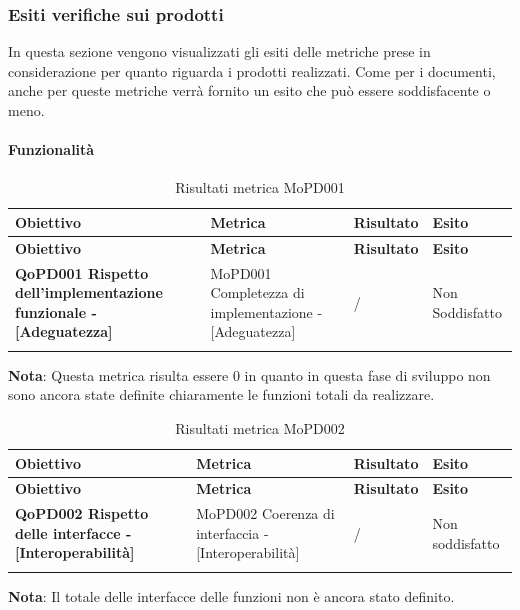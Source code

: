 \documentclass[../piano-di-qualifica.tex]{subfiles}
\begin{document}
\subsubsection{Esiti verifiche sui prodotti}
\label{sub:esiti_verifiche_sui_prodotti}
In questa sezione vengono visualizzati gli esiti delle metriche prese in considerazione per quanto riguarda i prodotti realizzati. Come per i documenti, anche per queste metriche verrà fornito un esito che può essere soddisfacente o meno.

\paragraph{Funzionalità}
\label{sub:funzionalita}

\renewcommand{\arraystretch}{2} %
\begin{longtable}[H]{>{\centering\bfseries}m{5cm} >{\centering}m{5cm} >{\centering}m{2.5cm} >{\centering\arraybackslash}m{2.5cm}}  
  \rowcolor{lightgray}
  {\textbf{Obiettivo}} & {\textbf{Metrica}} & {\textbf{Risultato}} & {\textbf{Esito}}  \\
  \endfirsthead%
  \rowcolor{lightgray}
  {\textbf{Obiettivo}} & {\textbf{Metrica}} & {\textbf{Risultato}} & {\textbf{Esito}}  \\
  \endhead%
  \textbf{QoPD001 Rispetto dell’implementazione funzionale - [Adeguatezza]} & MoPD001 Completezza di implementazione - [Adeguatezza] & / & Non Soddisfatto \\
  \caption{Risultati metrica MoPD001}
  \label{tab:my-table}
\end{longtable}
\textbf{Nota}: Questa metrica risulta essere 0 in quanto in questa fase di sviluppo non sono ancora state definite chiaramente le funzioni totali da realizzare.

\renewcommand{\arraystretch}{2} %
\begin{longtable}[H]{>{\centering\bfseries}m{5cm} >{\centering}m{5cm} >{\centering}m{2.5cm} >{\centering\arraybackslash}m{2.5cm}}  
  \rowcolor{lightgray}
  {\textbf{Obiettivo}} & {\textbf{Metrica}} & {\textbf{Risultato}} & {\textbf{Esito}}  \\
  \endfirsthead%
  \rowcolor{lightgray}
  {\textbf{Obiettivo}} & {\textbf{Metrica}} & {\textbf{Risultato}} & {\textbf{Esito}}  \\
  \endhead%
  \textbf{QoPD002 Rispetto delle interfacce - [Interoperabilità]} & MoPD002 Coerenza di interfaccia - [Interoperabilità] & / & Non soddisfatto \\
  \caption{Risultati metrica MoPD002}
  \label{tab:my-table}
\end{longtable}
\textbf{Nota}: Il totale delle interfacce delle funzioni non è ancora stato definito.
\end{document}

